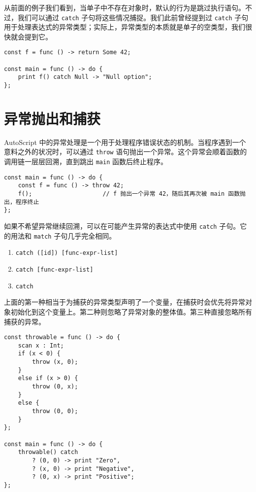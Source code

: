 从前面的例子我们看到，当单子中不存在对象时，默认的行为是跳过执行语句。不过，我们可以通过 \lstinline!catch! 子句将这些情况捕捉。我们此前曾经提到过 \lstinline!catch! 子句用于处理表达式的异常类型；实际上，异常类型的本质就是单子的空类型，我们很快就会提到它。

\begin{lstlisting}
const f = func () -> return Some 42;

const main = func () -> do {
	print f() catch Null -> "Null option";
};
\end{lstlisting}



\section{异常抛出和捕获}

AutoScript 中的异常处理是一个用于处理程序错误状态的机制。当程序遇到一个意料之外的状况时，可以通过 \lstinline!throw! 语句抛出一个异常。这个异常会顺着函数的调用链一层层回溯，直到跳出 \lstinline!main! 函数后终止程序。

\begin{lstlisting}
const main = func () -> do {
	const f = func () -> throw 42;
	f();					// f 抛出一个异常 42，随后其再次被 main 函数抛出，程序终止
};
\end{lstlisting}

如果不希望异常继续回溯，可以在可能产生异常的表达式中使用 \lstinline!catch! 子句。它的用法和 \lstinline!match! 子句几乎完全相同。

\begin{grammar}
\begin{enumerate}
	\item \lstinline!catch ([id]) [func-expr-list]!
	\item \lstinline!catch [func-expr-list]!
	\item \lstinline!catch!
\end{enumerate}
\end{grammar}

上面的第一种相当于为捕获的异常类型声明了一个变量，在捕获时会优先将异常对象初始化到这个变量上。第二种则忽略了异常对象的整体值。第三种直接忽略所有捕获的异常。

\begin{lstlisting}
const throwable = func () -> do {
	scan x : Int;
	if (x < 0) {
		throw (x, 0);
	}
	else if (x > 0) {
		throw (0, x);
	}
	else {
		throw (0, 0);
	}
};

const main = func () -> do {
	throwable() catch
		? (0, 0) -> print "Zero",
		? (x, 0) -> print "Negative",
		? (0, x) -> print "Positive";
};
\end{lstlisting}

